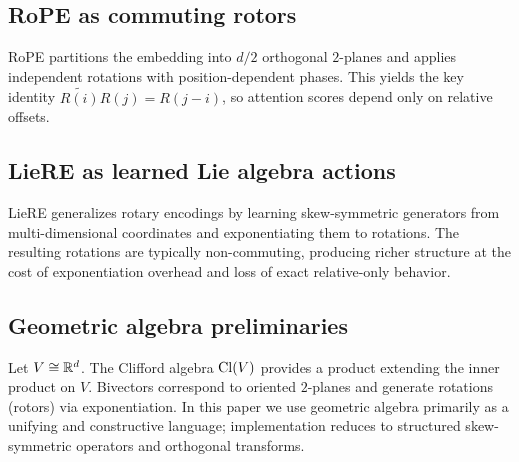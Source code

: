 \subsection{RoPE as commuting rotors}
RoPE partitions the embedding into $d/2$ orthogonal $2$-planes and applies independent rotations with position-dependent phases.
This yields the key identity $\widetilde{R(i)} R(j) = R(j-i)$, so attention scores depend only on relative offsets.

\subsection{LieRE as learned Lie algebra actions}
LieRE generalizes rotary encodings by learning skew-symmetric generators from multi-dimensional coordinates and exponentiating them to rotations.
The resulting rotations are typically non-commuting, producing richer structure at the cost of exponentiation overhead and loss of exact relative-only behavior.

\subsection{Geometric algebra preliminaries}
Let $V\cong\mathbb{R}^d$. The Clifford algebra $\mathrm{Cl}(V)$ provides a product extending the inner product on $V$.
Bivectors correspond to oriented $2$-planes and generate rotations (rotors) via exponentiation.
In this paper we use geometric algebra primarily as a unifying and constructive language; implementation reduces to structured skew-symmetric operators and orthogonal transforms.
